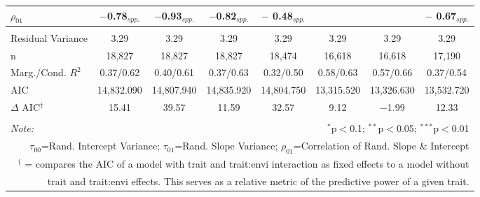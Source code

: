\documentclass[12pt, letterpaper]{article}
\begin{document}
\begin{table}[h]
{\begin{tabular}{lccccccc}
  $\rho_{01}$ & $-$0.78$_{spp.}$ & $-$0.93$_{spp.}$ & $-$0.82$_{spp.}$ & $-$ 0.48$_{spp.}$ & & & $-$ 0.67$_{spp.}$ \\
\hline \\[-1.8ex] 
\rowcolor[gray]{.95} Residual Variance & 3.29 & 3.29 & 3.29 & 3.29 & 3.29 & 3.29 & 3.29\\
n & 18,827 & 18,827 & 18,827 & 18,474 & 16,618 & 16,618 & 17,190\\ 
\rowcolor[gray]{.95} Marg./Cond. $R^2$ & 0.37/0.62 & 0.40/0.61 & 0.37/0.63 & 0.32/0.50 & 0.58/0.63 & 0.57/0.66 & 0.37/0.54 \\
AIC   & 14,832.090 & 14,807.940 & 14,835.920 & 14,804.750 & 13,315.520 & 13,326.630 & 13,532.720 \\ 
\hline 
\rowcolor[gray]{.95}$\Delta$ AIC$^\dagger$  & 15.41 & 39.57 & 11.59 & 32.57 & 9.12 & $-$1.99 & 12.33 \\
\hline 
\hline \\[-1.8ex] 
\textit{Note:}  & \multicolumn{7}{r}{$^{*}$p$<$0.1; $^{**}$p$<$0.05; $^{***}$p$<$0.01}\\
\multicolumn{8}{r}{$\tau_{00}$=Rand. Intercept Variance; $\tau_{01}$=Rand. Slope Variance; $\rho_{01}$=Correlation of Rand. Slope \& Intercept}\\ 
\multicolumn{8}{r}{$^\dagger$ = compares the AIC of a model with trait and trait:envi interaction as fixed effects to a model without}\\
\multicolumn{8}{r}{trait and trait:envi effects. This serves as a relative metric of the predictive power of a given trait.}
\end{tabular}} 
\end{table} 
\end{document}
